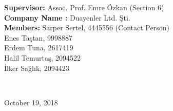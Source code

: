 \begin{titlepage}
\begin{minipage}{\textwidth}
\begin{flushleft}
	\large{\textbf{Supervisor\hspace{1.55cm}:}}
	Assoc. Prof. Emre Özkan (Section 6)\\
	\large{\textbf{Company Name :}}
	Duayenler Ltd. Şti.\\
	\large{\textbf{Members\hspace{1.89cm}:}}
	Sarper Sertel, 4445556 (Contact Person) \\\hspace{4.39cm} Enes Taştan, 9998887 \\\hspace{4.39cm} Erdem Tuna, 2617419 \\\hspace{4.39cm} Halil Temurtaş, 2094522 \\\hspace{4.39cm} İlker Sağlık, 2094423   \\

\end{flushleft}
\end{minipage}\\[1cm]



\begin{flushbottom}
{\large October 19, 2018}\\[1cm] %
	
\end{flushbottom}




\end{titlepage}


\blankpage



\tableofcontents
\newpage



